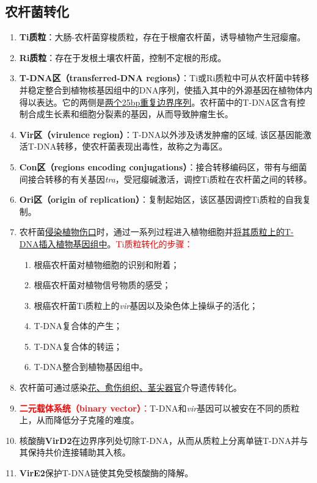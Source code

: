 \subsection{农杆菌转化}
\begin{enumerate}
    \item \textbf{Ti质粒}：大肠-农杆菌穿梭质粒，存在于根瘤农杆菌，诱导植物产生冠瘿瘤。
    \item \textbf{Ri质粒}：存在于发根土壤农杆菌，控制不定根的形成。
    \item \textbf{T-DNA区（transferred-DNA regions）}：Ti或Ri质粒中可从农杆菌中转移并稳定整合到植物核基因组中的DNA序列，使插入其中的外源基因在植物体内得以表达。它的两侧是\uline{两个25bp重复边界序列}。农杆菌中的T-DNA区含有控制合成生长素和细胞分裂素的基因，从而导致肿瘤生长。
    \item \textbf{Vir区（virulence region）}：T-DNA以外涉及诱发肿瘤的区域, 该区基因能激活T-DNA转移，使农杆菌表现出毒性，故称之为毒区。
    \item \textbf{Con区（regions encoding conjugations）}：接合转移编码区，带有与细菌间接合转移的有关基因\emph{tra}，受冠瘿碱激活，调控Ti质粒在农杆菌之间的转移。
    \item \textbf{Ori区（origin of replication）}：复制起始区，该区基因调控Ti质粒的自我复制。
    \item 农杆菌\uline{侵染植物伤口}时，通过一系列过程进入植物细胞并\uline{将其质粒上的T-DNA插入植物基因组中}。\textcolor{red}{Ti质粒转化的步骤：}
    \begin{enumerate}
        \item 根癌农杆菌对植物细胞的识别和附着；
        \item 根癌农杆菌对植物信号物质的感受；
        \item 根癌农杆菌Ti质粒上的\emph{vir}基因以及染色体上操纵子的活化；
        \item T-DNA复合体的产生；
        \item T-DNA复合体的转运；
        \item T-DNA整合到植物基因组中。
    \end{enumerate}
    \item 农杆菌可通过感染\uline{花、愈伤组织、茎尖器官}介导遗传转化。
    \item \textcolor{red}{\textbf{二元载体系统（binary vector）}：}T-DNA和\emph{vir}基因可以被安在不同的质粒上，从而降低分子克隆的难度。
    \item 核酸酶\textbf{VirD2}在边界序列处切除T-DNA，从而从质粒上分离单链T-DNA并与其保持共价连接辅助其入核。
    \item \textbf{VirE2}保护T-DNA链使其免受核酸酶的降解。
\end{enumerate}

